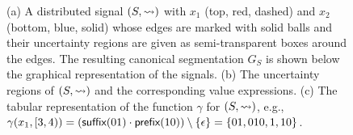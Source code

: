 \begin{figure}
\begin{subfigure}{.5\textwidth}
	\end{subfigure}
	\footnotesize{
	\caption{(a) A distributed signal $(S,{\rightsquigarrow})$ with $x_1$ (top, red, dashed) and $x_2$ (bottom, blue, solid) whose edges are marked with solid balls and their uncertainty regions are given as semi-transparent boxes around the edges. The resulting canonical segmentation $G_S$ is shown below the graphical representation of the signals. (b) The uncertainty regions of $(S,{\rightsquigarrow})$ and the corresponding value expressions. (c) The tabular representation of the function $\gamma$ for $(S,{\rightsquigarrow})$, e.g., \(\gamma(x_1, [3,4)) = (\textsf{suffix}(01) \cdot \textsf{prefix}(10)) \setminus \{\epsilon\} = \{ 01, 010, 1, 10\}\).}\label{fig:csve}}
	\vspace{1em}
\end{figure}


